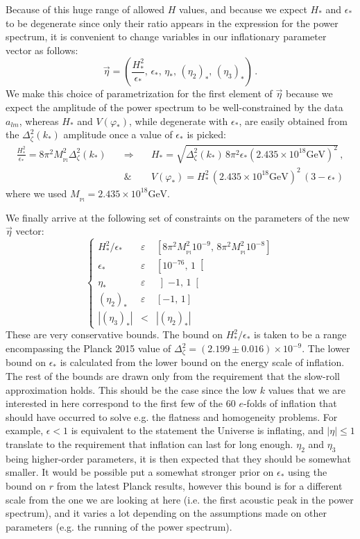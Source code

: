 \documentclass[prd, onecolumn, floatfix, letterpaper, nofootinbib, amsmath, amssymb, superscriptaddress]{revtex4}
\renewcommand{\(}{\left(}
\renewcommand{\)}{\right)}
\renewcommand{\[}{\left[}
\renewcommand{\]}{\right]}
\def\be{\begin{equation}}
\def\ee{\end{equation}}
\def\bea{\begin{eqnarray}}
\def\eea{\end{eqnarray}}
\newcommand{\Mp}{M_{_\mathrm{Pl}}}
\begin{document}
Because of this huge range of allowed $H$ values, and because we expect $H_*$ and $\epsilon_*$ to be degenerate since only their ratio appears in the expression for the power spectrum, it is convenient to change variables in our inflationary parameter vector as follows:
\be
	\vec{\eta}=\left(\frac{H^2_*}{\epsilon_*},\, \epsilon_*, \,\eta_*, \, (\eta_2)_*, \,(\eta_3)_*\right)\, .
\ee
We make this choice of parametrization for the first element of $\vec{\eta}$ because we expect the amplitude of the power spectrum to be well-constrained by the data $a_{lm}$, whereas $H_*$ and $V(\varphi_*)$, while degenerate with $\epsilon_*$, are easily obtained from the $\Delta^2_\zeta(k_*)$ amplitude once a value of $\epsilon_*$ is picked:
\bea
	\frac{H^2_*}{\epsilon_*}=8\pi^2\Mp^2\Delta^2_\zeta(k_*)\quad&\Rightarrow&\quad H_*=\sqrt{\Delta^2_\zeta(k_*)\, 8\pi^2\epsilon_*(2.435\times10^{18}\mathrm{GeV})^2}\, ,\\
	&\&&\quad V(\varphi_*)=H_*^2 \,(2.435\times10^{18}\mathrm{GeV})^2 \, (3-\epsilon_*)
\eea
where we used $\Mp=2.435\times10^{18}\mathrm{GeV}$.

We finally arrive at the following set of constraints on the parameters of the new $\vec{\eta}$ vector:
\be
\label{eq:priors}
	\left\{\begin{array}{ccl} H^2_*/\epsilon_*&\varepsilon & \left[ 8\pi^2\Mp^2 10^{-9},\,  8\pi^2\Mp^2 10^{-8}\right] \\
	\epsilon_* &\varepsilon& \left[10^{-76},\, 1 \right[\\
	\eta_*  &\varepsilon& \left]-1,\, 1 \right[\\
	(\eta_2)_*  &\varepsilon& \left[-1,\, 1 \right]\\
	|(\eta_3)_*|  &<& |(\eta_2)_*|
	\end{array} \right.
\ee
These are very conservative bounds. The bound on $ H^2_*/\epsilon_*$ is taken to be a range encompassing the Planck 2015 value of $\Delta^2_\zeta=(2.199\pm 0.016) \times10^{-9}$. The lower bound on $\epsilon_*$ is calculated from the lower bound on the energy scale of inflation. The rest of the bounds are drawn only from the requirement that the slow-roll approximation holds. This should be the case since the low $k$ values that we are interested in here correspond to the first few of the 60 $e$-folds of inflation that should have occurred to solve e.g. the flatness and homogeneity problems. For example, $\epsilon<1$ is equivalent to the statement the Universe is inflating, and $|\eta|\leq1$ translate to the requirement that inflation can last for long enough. $\eta_2$ and $\eta_3$ being higher-order parameters, it is then expected that they should be somewhat smaller. It would be possible put a somewhat stronger prior on $\epsilon_*$ using the bound on $r$ from the latest Planck results, however this bound is for a different scale from the one we are looking at here (i.e. the first acoustic peak in the power spectrum), and it varies a lot depending on the assumptions made on other parameters (e.g. the running of the power spectrum). 
\end{document}
